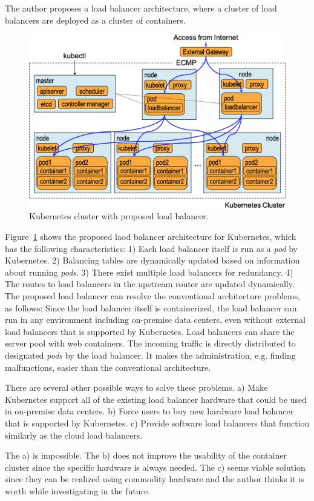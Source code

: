 The author proposes a load balancer architecture, where a cluster of load balancers are deployed as a cluster of containers.

\begin{figure}
  \centering
  \includegraphics[width=0.8\columnwidth]{Figs/K8sProposed}
  \caption{Kubernetes cluster with proposed load balancer.}
  \label{fig:K8sProposed}
\end{figure}

Figure~\ref{fig:K8sProposed} shows the proposed laod balancer architecture for Kubernetes,
which has the following characteristics:
1) Each load balancer itself is run as a {\em pod} by Kubernetes. 
2) Balancing tables are dynamically updated based on information about running {\em pods}.
3) There exist multiple load balancers for redundancy.
4) The routes to load balancers in the upstream router are updated dynamically.
The proposed load balancer can resolve the conventional architecture problems, as follows:
Since the load balancer itself is containerized, the load balancer can run in any environment including on-premise data centers, even without external load balancers that is supported by Kubernetes.
Load balancers can share the server pool with web containers.
The incoming traffic is directly distributed to designated {\em pods} by the load balancer. 
It makes the administration, e.g. finding malfunctions, easier than the conventional architecture.

There are several other possible ways to solve these problems.
a) Make Kubernetes support all of the existing load balancer hardware that could be used in on-premise data centers.
b) Force users to buy new hardware load balancer that is supported by Kubernetes.
c) Provide software load balancers that function similarly as the cloud load balancers.

The a) is impossible. The b) does not improve the usability of the container cluster since the specific hardware is always needed.
The c) seems viable solution since they can be realized using commodity hardware and the author thinks it is worth while investigating in the future.

